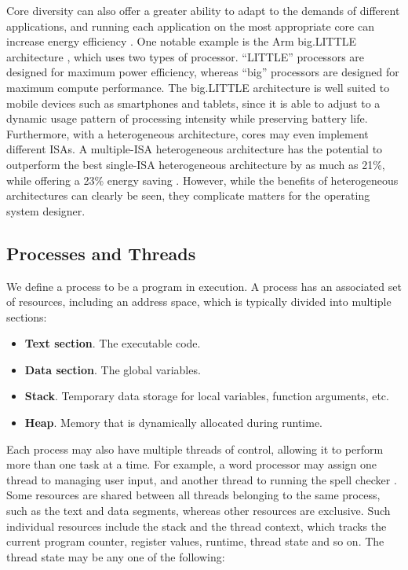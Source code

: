 \documentclass[bsc,frontabs,singlespacing,parskip,deptreport]{infthesis}     %
\begin{document}
Core diversity can also offer a greater ability to adapt to the demands of different applications, and running each application on the most appropriate core can increase energy efficiency \cite{kumar_2003}. One notable example is the Arm big.LITTLE architecture \cite{big.little}, which uses two types of processor. “LITTLE” processors are designed for maximum power efficiency, whereas “big” processors are designed for maximum compute performance. The big.LITTLE architecture is well suited to mobile devices such as smartphones and tablets, since it is able to adjust to a dynamic usage pattern of processing intensity while preserving battery life. Furthermore, with a heterogeneous architecture, cores may even implement different ISAs. A multiple-ISA heterogeneous architecture has the potential to outperform the best single-ISA heterogeneous architecture by as much as 21\%, while offering a 23\% energy saving \cite{venkat_2014}. However, while the benefits of heterogeneous architectures can clearly be seen, they complicate matters for the operating system designer.

\subsection{Processes and Threads} 
\label{processes-threads}
We define a process to be a program in execution. A process has an associated set of resources, including an address space, which is typically divided into multiple sections:

\begin{itemize}
    \item{\textbf{Text section}. The executable code.}
    \item{\textbf{Data section}. The global variables.}
    \item{\textbf{Stack}. Temporary data storage for local variables, function arguments, etc.}
    \item{\textbf{Heap}. Memory that is dynamically allocated during runtime.}
\end{itemize}

Each process may also have multiple threads of control, allowing it to perform more than one task at a time. For example, a word processor may assign one thread to managing user input, and another thread to running the spell checker \cite{silberschatz}. Some resources are shared between all threads belonging to the same process, such as the text and data segments, whereas other resources are exclusive. Such individual resources include the stack and the thread context, which tracks the current program counter, register values, runtime, thread state and so on. The thread state may be any one of the following:
\end{document}
